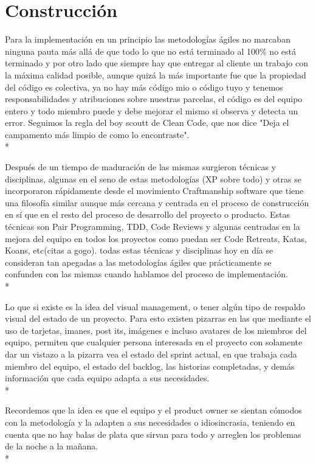 \documentclass[../pfc.tex]{subfiles}
\begin{document}
	
	\section{Construcción}
	
	Para la implementación en un principio las metodologías ágiles no marcaban ninguna pauta más allá de que todo lo que no está terminado al 100\% no está terminado y por otro lado que siempre hay que entregar al cliente un trabajo con la máxima calidad posible, aunque quizá la más importante fue que la propiedad del código es colectiva, ya no hay más código mio o código tuyo y tenemos responsabilidades y atribuciones sobre nuestras parcelas, el código es del equipo entero y todo miembro puede y debe mejorar el mismo si observa y detecta un error. Seguimos la regla del boy scoutt de Clean Code\cite{cleancode}, que nos dice "Deja el campamento más limpio de como lo encontraste".\\*
	
	Después de un tiempo de maduración de las mismas surgieron técnicas y disciplinas, algunas en el seno de estas metodologías (XP sobre todo) y otras se incorporaron rápidamente desde el movimiento Craftmanship software \cite{manifestocraft} que tiene una filosofía similar aunque más cercana y centrada en el proceso de construcción en sí que en el resto del proceso de desarrollo del proyecto o producto. Estas técnicas son Pair Programming, TDD, Code Reviews y algunas centradas en la mejora del equipo en todos los proyectos como puedan ser Code Retreats, Katas, Koans, etc(citas a gogo). todas estas técnicas y disciplinas hoy en día se consideran tan apegadas a las metodologías ágiles que prácticamente se confunden con las mismas cuando hablamos del proceso de implementación.\\*
	
	Lo que si existe es la idea del visual management, o tener algún tipo de respaldo visual del estado de un proyecto. Para esto existen pizarras en las que mediante el uso de tarjetas, imanes, post its, imágenes e incluso avatares de los miembros del equipo, permiten que cualquier persona interesada en el proyecto con solamente dar un vistazo a la pizarra vea el estado del sprint actual, en que trabaja cada miembro del equipo, el estado del backlog, las historias completadas, y demás información que cada equipo adapta a sus necesidades.\\*
	
	Recordemos que la idea es que el equipo y el product owner se sientan cómodos con la metodología y la adapten a sus necesidades o idiosincrasia, teniendo en cuenta que no hay balas de plata que sirvan para todo y arreglen los problemas de la noche a la mañana.\\* 
	
\end{document}
